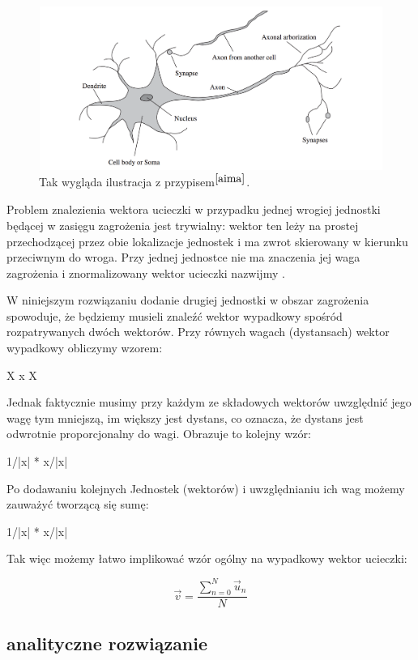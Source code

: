\documentclass[12pt]{report}
\begin{document}
\begin{figure}[h!]
\includegraphics[width=\textwidth]{neuron}
\caption{Tak wygląda ilustracja z przypisem$^{\cite{aima}}$.}
\end{figure}

Problem znalezienia wektora ucieczki w przypadku jednej wrogiej jednostki będącej w zasięgu zagrożenia jest trywialny:
wektor ten leży na prostej przechodzącej przez obie lokalizacje jednostek i ma zwrot skierowany w kierunku przeciwnym do wroga. Przy jednej jednostce nie ma znaczenia jej waga zagrożenia i znormalizowany wektor ucieczki nazwijmy .


W niniejszym rozwiązaniu dodanie drugiej jednostki w obszar zagrożenia spowoduje, że będziemy musieli znaleźć wektor wypadkowy spośród rozpatrywanych dwóch wektorów. Przy równych wagach (dystansach) wektor wypadkowy obliczymy wzorem:

X x X

Jednak faktycznie musimy przy każdym ze składowych wektorów uwzględnić jego wagę tym mniejszą, im większy jest dystans, co oznacza, że dystans jest odwrotnie proporcjonalny do wagi. Obrazuje to kolejny wzór:

1/|x| * x/|x|

Po dodawaniu kolejnych Jednostek (wektorów) i uwzględnianiu ich wag możemy zauważyć tworzącą się sumę:




1/|x| * x/|x|

Tak więc możemy łatwo implikować wzór ogólny na wypadkowy wektor ucieczki:

$$\vec v = \dfrac{\sum_{n=0}^{N}  \vec u_n}{N}   $$

\subsection{analityczne rozwiązanie}
\end{document}
